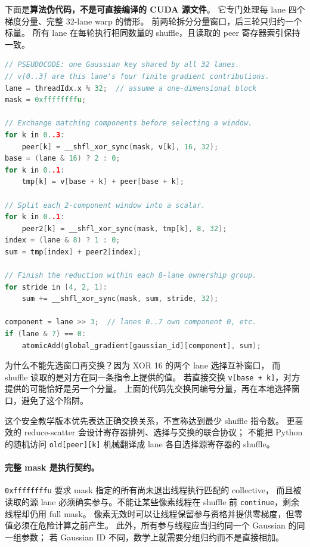 下面是\textbf{算法伪代码，不是可直接编译的 CUDA 源文件}。
它专门处理每 lane 四个梯度分量、完整 32-lane warp 的情形。
前两轮拆分分量窗口，后三轮只归约一个标量。
所有 lane 在每轮执行相同数量的 shuffle，且读取的 peer 寄存器索引保持一致。
\begin{lstlisting}[language=C++]
// PSEUDOCODE: one Gaussian key shared by all 32 lanes.
// v[0..3] are this lane's four finite gradient contributions.
lane = threadIdx.x % 32;  // assume a one-dimensional block
mask = 0xffffffffu;

// Exchange matching components before selecting a window.
for k in 0..3:
    peer[k] = __shfl_xor_sync(mask, v[k], 16, 32);
base = (lane & 16) ? 2 : 0;
for k in 0..1:
    tmp[k] = v[base + k] + peer[base + k];

// Split each 2-component window into a scalar.
for k in 0..1:
    peer2[k] = __shfl_xor_sync(mask, tmp[k], 8, 32);
index = (lane & 8) ? 1 : 0;
sum = tmp[index] + peer2[index];

// Finish the reduction within each 8-lane ownership group.
for stride in [4, 2, 1]:
    sum += __shfl_xor_sync(mask, sum, stride, 32);

component = lane >> 3;  // lanes 0..7 own component 0, etc.
if (lane & 7) == 0:
    atomicAdd(global_gradient[gaussian_id][component], sum);
\end{lstlisting}

为什么不能先选窗口再交换？因为 XOR 16 的两个 lane 选择互补窗口，
而 shuffle 读取的是对方在同一条指令上提供的值。
若直接交换 \texttt{v[base + k]}，对方提供的可能恰好是另一个分量。
上面的代码先交换同编号分量，再在本地选择窗口，避免了这个陷阱。

这个安全教学版本优先表达正确交换关系，不宣称达到最少 shuffle 指令数。
更高效的 reduce-scatter 会设计寄存器排列、选择与交换的联合协议；
不能把 Python 的随机访问 \texttt{old[peer][k]} 机械翻译成 lane 各自选择源寄存器的 shuffle。

\paragraph{完整 mask 是执行契约。}
\texttt{0xffffffffu} 要求 mask 指定的所有尚未退出线程执行匹配的 collective，
而且被读取的源 lane 必须确实参与。不能让某些像素线程在 shuffle 前
\texttt{continue}，剩余线程却仍用 full mask。
像素无效时可以让线程保留参与资格并提供零梯度，但零值必须在危险计算之前产生。
此外，所有参与线程应当归约同一个 Gaussian 的同一组参数；
若 Gaussian ID 不同，数学上就需要分组归约而不是直接相加。

